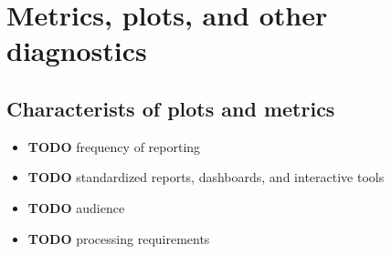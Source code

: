 \section{Metrics, plots, and other diagnostics}
\label{sec:org3e593b4}
\subsection{Characterists of plots and metrics}
\label{sec:orgef19931}
\begin{itemize}
\item {\bfseries\sffamily TODO} frequency of reporting
\label{sec:org1331acf}
\item {\bfseries\sffamily TODO} standardized reports, dashboards, and interactive tools
\label{sec:org003905a}
\item {\bfseries\sffamily TODO} audience
\label{sec:org020e5de}
\item {\bfseries\sffamily TODO} processing requirements
\label{sec:orgbfc101b}
\end{itemize}

